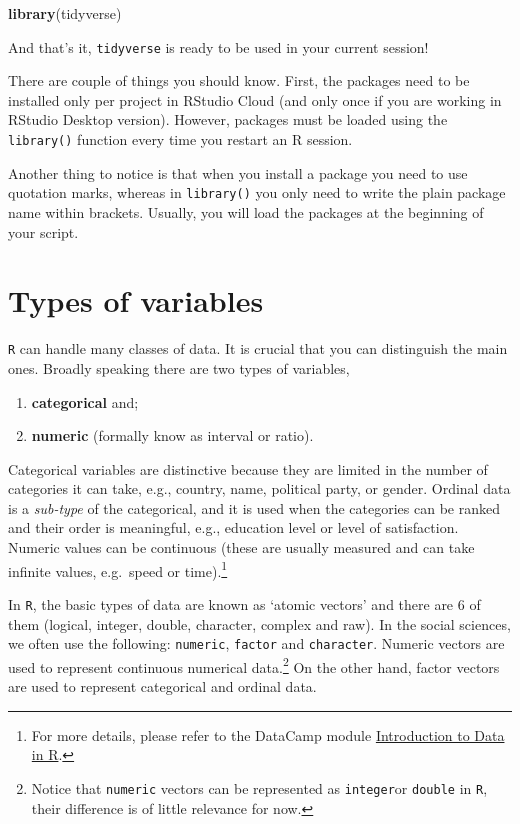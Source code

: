\documentclass[
]{book}
\newenvironment{Shaded}{\begin{snugshade}}{\end{snugshade}}
\newcommand{\FunctionTok}[1]{\textcolor[rgb]{0.13,0.29,0.53}{\textbf{#1}}}
\newcommand{\NormalTok}[1]{#1}
\providecommand{\tightlist}{%
  \setlength{\itemsep}{0pt}\setlength{\parskip}{0pt}}
\begin{document}
\begin{Shaded}
\begin{Highlighting}[]
\FunctionTok{library}\NormalTok{(tidyverse)}
\end{Highlighting}
\end{Shaded}

And that's it, \texttt{tidyverse} is ready to be used in your current session!

There are couple of things you should know. First, the packages need to be installed only per project in RStudio Cloud (and only once if you are working in RStudio Desktop version). However, packages must be loaded using the \texttt{library()} function every time you restart an R session.

Another thing to notice is that when you install a package you need to use quotation marks, whereas in \texttt{library()} you only need to write the plain package name within brackets. Usually, you will load the packages at the beginning of your script.

\hypertarget{types-of-variables}{%
\section{Types of variables}\label{types-of-variables}}

\texttt{R} can handle many classes of data. It is crucial that you can distinguish the main ones. Broadly speaking there are two types of variables,

\begin{enumerate}
\def\labelenumi{\arabic{enumi}.}
\tightlist
\item
  \textbf{categorical} and;
\item
  \textbf{numeric} (formally know as interval or ratio).
\end{enumerate}

Categorical variables are distinctive because they are limited in the number of categories it can take, e.g., country, name, political party, or gender. Ordinal data is a \emph{sub-type} of the categorical, and it is used when the categories can be ranked and their order is meaningful, e.g., education level or level of satisfaction. Numeric values can be continuous (these are usually measured and can take infinite values, e.g.~speed or time).\footnote{For more details, please refer to the DataCamp module \href{https://learn.datacamp.com/courses/introduction-to-data-in-r}{Introduction to Data in R}.}

In \texttt{R}, the basic types of data are known as `atomic vectors' and there are 6 of them (logical, integer, double, character, complex and raw). In the social sciences, we often use the following: \texttt{numeric}, \texttt{factor} and \texttt{character}. Numeric vectors are used to represent continuous numerical data.\footnote{Notice that \texttt{numeric} vectors can be represented as \texttt{integer}or \texttt{double} in \texttt{R}, their difference is of little relevance for now.} On the other hand, factor vectors are used to represent categorical and ordinal data.
\end{document}
